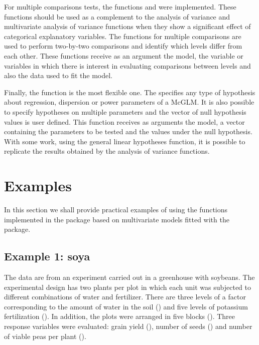 \documentclass[article]{jss}\usepackage[]{graphicx}\usepackage[]{xcolor}
\begin{document}
For  multiple comparisons tests, the functions  and  were implemented. These functions should be used as a complement to the analysis of variance and multivariate analysis of variance functions when they show a significant effect of categorical explanatory variables. The functions for multiple comparisons are used to perform two-by-two comparisons and identify which levels differ from each other. These functions receive as an argument the model, the variable or variables in which there is interest in evaluating comparisons between levels and also the data used to fit the model.

Finally, the  function is the most flexible one. The  specifies any type of hypothesis about regression, dispersion or power parameters of a McGLM. It is also possible to specify hypotheses on multiple parameters and the vector of null hypothesis values is user defined. This function receives as arguments the model, a vector containing the parameters to be tested and the values under the null hypothesis. With some work, using the general linear hypotheses function, it is possible to replicate the results obtained by the analysis of variance functions.


\section{Examples}\label{sec:exemplos}

In this section we shall provide practical examples of using the functions implemented in the  package based on multivariate models fitted with the  package.



\subsection{Example 1: soya}

The data are from an experiment carried out in a greenhouse with soybeans. The experimental design has two plants per plot in which each unit was subjected to different combinations of water and fertilizer. There are three levels of a factor corresponding to the amount of water in the soil () and five levels of potassium fertilization (). In addition, the plots were arranged in five blocks (). Three response variables were evaluated: grain yield (), number of seeds () and number of viable peas per plant ().
\end{document}
